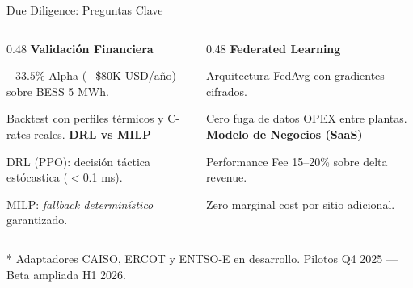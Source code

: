 \documentclass[10pt,aspectratio=169]{beamer}
\let\tempone\itemize
\let\temptwo\enditemize
\renewenvironment{itemize}{\tempone\addtolength{\itemsep}{0.3em}}{\temptwo}
\begin{document}
\begin{frame}{Due Diligence: Preguntas Clave}
  \begin{columns}[T]
    \begin{column}{0.48\textwidth}
      \textbf{\color{accentorange}Validaci\'on Financiera}
      \begin{itemize}
        \item $+33.5\%$ Alpha ($+$\$80K USD/a\~no) sobre BESS 5 MWh.
        \item Backtest con perfiles t\'ermicos y C-rates reales.
      \end{itemize}
      \vspace{0.2cm}
      \textbf{\color{accentorange}DRL vs MILP}
      \begin{itemize}
        \item DRL (PPO): decisi\'on t\'actica est\'ocastica ($<$0.1 ms).
        \item MILP: \textit{fallback determin\'istico} garantizado.
      \end{itemize}
    \end{column}
    \begin{column}{0.48\textwidth}
      \textbf{\color{accentorange}Federated Learning}
      \begin{itemize}
        \item Arquitectura FedAvg con gradientes cifrados.
        \item Cero fuga de datos OPEX entre plantas.
      \end{itemize}
      \vspace{0.2cm}
      \textbf{\color{accentorange}Modelo de Negocios (SaaS)}
      \begin{itemize}
        \item Performance Fee 15--20\% sobre delta revenue.
        \item Zero marginal cost por sitio adicional.
      \end{itemize}
    \end{column}
  \end{columns}
  \vspace{0.5cm}
  \centering\tiny\textcolor{textmuted}{* Adaptadores CAISO, ERCOT y ENTSO-E en desarrollo. Pilotos Q4 2025 --- Beta ampliada H1 2026.}
\end{frame}
\end{document}
